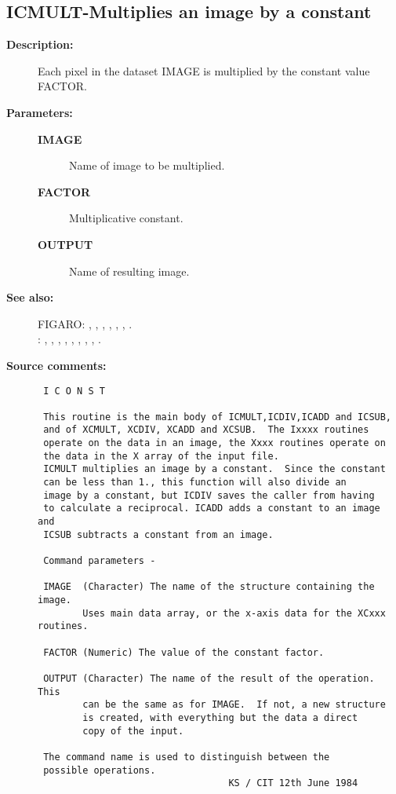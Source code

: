 \subsection{ICMULT-\label{ICMULT}Multiplies an image by a constant}
\begin{description}

\item [{\bf Description:}]
 Each pixel in the dataset IMAGE is multiplied by the
 constant value FACTOR.

\item [{\bf Parameters:}]
\begin{description}
\item [{\bf IMAGE}]
 Name of image to be multiplied.
\item [{\bf FACTOR}]
 Multiplicative constant.
\item [{\bf OUTPUT}]
 Name of resulting image.
\end{description}

\item [{\bf See also:}]
FIGARO: , , , , , , .\\
: , , , , , , , , .\\

\item [{\bf Source comments:}]
\begin{verbatim}
 I C O N S T

 This routine is the main body of ICMULT,ICDIV,ICADD and ICSUB,
 and of XCMULT, XCDIV, XCADD and XCSUB.  The Ixxxx routines
 operate on the data in an image, the Xxxx routines operate on
 the data in the X array of the input file.
 ICMULT multiplies an image by a constant.  Since the constant
 can be less than 1., this function will also divide an
 image by a constant, but ICDIV saves the caller from having
 to calculate a reciprocal. ICADD adds a constant to an image and
 ICSUB subtracts a constant from an image.

 Command parameters -

 IMAGE  (Character) The name of the structure containing the image.
        Uses main data array, or the x-axis data for the XCxxx routines.

 FACTOR (Numeric) The value of the constant factor.

 OUTPUT (Character) The name of the result of the operation.  This
        can be the same as for IMAGE.  If not, a new structure
        is created, with everything but the data a direct
        copy of the input.

 The command name is used to distinguish between the
 possible operations.
                                  KS / CIT 12th June 1984
\end{verbatim}
\end{description}
